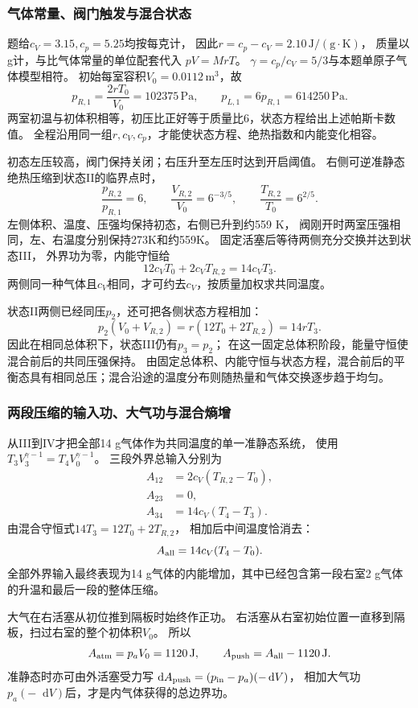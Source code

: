 \documentclass[UTF8,fontset=fandol,a4paper,11pt]{ctexart}
\newcommand{\dd}{\mathop{}\!\mathrm{d}}
\begin{document}
\subsubsection*{气体常量、阀门触发与混合状态}
题给$c_V=3.15,c_p=5.25$均按每克计，
因此$r=c_p-c_V=2.10\,\mathrm{J/(g\cdot K)}$，
质量以g计，与比气体常量的单位配套代入 $pV=MrT$。
$\gamma=c_p/c_V=5/3$与本题单原子气体模型相符。
初始每室容积$V_0=0.0112\,\mathrm{m^3}$，故
\[
p_{R,1}=\frac{2rT_0}{V_0}=102375\,\mathrm{Pa},\qquad
p_{L,1}=6p_{R,1}=614250\,\mathrm{Pa}.
\]
两室初温与初体积相等，初压比正好等于质量比6，状态方程给出上述帕斯卡数值。
全程沿用同一组$r,c_V,c_p$，才能使状态方程、绝热指数和内能变化相容。

初态左压较高，阀门保持关闭；右压升至左压时达到开启阈值。
右侧可逆准静态绝热压缩到状态II的临界点时，
\[
\frac{p_{R,2}}{p_{R,1}}=6,\qquad
\frac{V_{R,2}}{V_0}=6^{-3/5},\qquad
\frac{T_{R,2}}{T_0}=6^{2/5}.
\]
左侧体积、温度、压强均保持初态，右侧已升到约559 K，
阀刚开时两室压强相同，左、右温度分别保持273K和约559K。
固定活塞后等待两侧充分交换并达到状态III，
外界功为零，内能守恒给
\[
12c_VT_0+2c_VT_{R,2}=14c_VT_3.
\]
两侧同一种气体且$c_V$相同，才可约去$c_V$，按质量加权求共同温度。

状态II两侧已经同压$p_2$，还可把各侧状态方程相加：
\[
p_2(V_0+V_{R,2})=r(12T_0+2T_{R,2})
=14rT_3.
\]
因此在相同总体积下，状态III仍有$p_3=p_2$；
在这一固定总体积阶段，能量守恒使混合前后的共同压强保持。
由固定总体积、内能守恒与状态方程，混合前后的平衡态具有相同总压；混合沿途的温度分布则随热量和气体交换逐步趋于均匀。

\subsubsection*{两段压缩的输入功、大气功与混合熵增}
从III到IV才把全部14 g气体作为共同温度的单一准静态系统，
使用$T_3V_3^{\gamma-1}=T_4V_0^{\gamma-1}$。
三段外界总输入分别为
\[
\begin{aligned}
A_{12}&=2c_V(T_{R,2}-T_0),\\
A_{23}&=0,\\
A_{34}&=14c_V(T_4-T_3).
\end{aligned}
\]
由混合守恒式$14T_3=12T_0+2T_{R,2}$，
相加后中间温度恰消去：
\[
A_{\rm all}=14c_V(T_4-T_0).
\]
全部外界输入最终表现为14 g气体的内能增加，其中已经包含第一段右室2 g气体的升温和最后一段的整体压缩。

大气在右活塞从初位推到隔板时始终作正功。
右活塞从右室初始位置一直移到隔板，扫过右室的整个初体积$V_0$。
所以
\[
A_{\rm atm}=p_aV_0=1120\,\mathrm J,\qquad
A_{\rm push}=A_{\rm all}-1120\,\mathrm J.
\]
准静态时亦可由外活塞受力写
$\dd A_{\rm push}=(p_{\rm in}-p_a)(-\dd V)$，
相加大气功$p_a(-\dd V)$后，才是内气体获得的总边界功。
\end{document}
